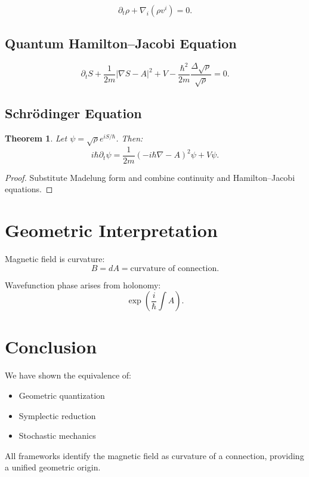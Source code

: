 \documentclass[11pt]{article}
\newtheorem{theorem}{Theorem}
\begin{document}
\[
\partial_t \rho + \nabla_i(\rho v^i)=0.
\]

\subsection{Quantum Hamilton--Jacobi Equation}

\[
\partial_t S + \frac{1}{2m}|\nabla S - A|^2 + V
- \frac{\hbar^2}{2m}\frac{\Delta\sqrt{\rho}}{\sqrt{\rho}}=0.
\]

\subsection{Schr\"odinger Equation}

\begin{theorem}
Let $\psi=\sqrt{\rho}e^{iS/\hbar}$. Then:
\[
i\hbar \partial_t \psi =
\frac{1}{2m}(-i\hbar\nabla - A)^2\psi + V\psi.
\]
\end{theorem}

\begin{proof}
Substitute Madelung form and combine continuity and Hamilton--Jacobi equations.
\end{proof}

\section{Geometric Interpretation}

Magnetic field is curvature:
\[
B = dA = \text{curvature of connection}.
\]

Wavefunction phase arises from holonomy:
\[
\exp\left(\frac{i}{\hbar}\int A\right).
\]

\section{Conclusion}

We have shown the equivalence of:
\begin{itemize}
\item Geometric quantization
\item Symplectic reduction
\item Stochastic mechanics
\end{itemize}

All frameworks identify the magnetic field as curvature of a connection, providing a unified geometric origin.
\end{document}
